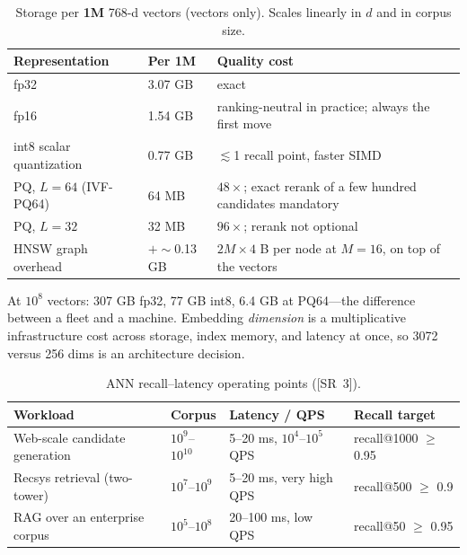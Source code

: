 \begin{table}[H]
\centering
\small
\caption{Storage per \textbf{1M} 768-d vectors (vectors only). Scales linearly in $d$ and in corpus size.}
\begin{tabularx}{\textwidth}{@{}llX@{}}
\toprule
\textbf{Representation} & \textbf{Per 1M} & \textbf{Quality cost} \\
\midrule
fp32 & 3.07 GB & exact \\
fp16 & 1.54 GB & ranking-neutral in practice; always the first move \\
int8 scalar quantization & 0.77 GB & $\lesssim$1 recall point, faster SIMD \\
PQ, $L{=}64$ (IVF-PQ64) & 64 MB & $48\times$; exact rerank of a few hundred candidates mandatory \\
PQ, $L{=}32$ & 32 MB & $96\times$; rerank not optional \\
HNSW graph overhead & $+\sim$0.13 GB & $2M \times 4$ B per node at $M{=}16$, on top of the vectors \\
\bottomrule
\end{tabularx}
\end{table}

At $10^{8}$ vectors: 307 GB fp32, 77 GB int8, 6.4 GB at PQ64---the difference
between a fleet and a machine. Embedding \emph{dimension} is a multiplicative
infrastructure cost across storage, index memory, and latency at once, so 3072
versus 256 dims is an architecture decision.

\begin{table}[H]
\centering
\small
\caption{ANN recall--latency operating points ([SR~3]).}
\begin{tabularx}{\textwidth}{@{}lllX@{}}
\toprule
\textbf{Workload} & \textbf{Corpus} & \textbf{Latency / QPS} & \textbf{Recall target} \\
\midrule
Web-scale candidate generation & $10^{9}$--$10^{10}$ & 5--20 ms, $10^{4}$--$10^{5}$ QPS & recall@1000 $\geq$ 0.95 \\
Recsys retrieval (two-tower) & $10^{7}$--$10^{9}$ & 5--20 ms, very high QPS & recall@500 $\geq$ 0.9 \\
RAG over an enterprise corpus & $10^{5}$--$10^{8}$ & 20--100 ms, low QPS & recall@50 $\geq$ 0.95 \\
\bottomrule
\end{tabularx}
\end{table}


